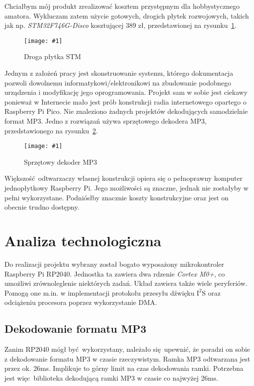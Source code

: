 \documentclass[polish]{aghengthesis}
\newcommand{\imgint}[4]{
	\begin{figure}[{#4}]
		\centering
		\texttt{[image: \#1]}
		\caption{#2}
		\label{#1}
	\end{figure}
}
\newcommand{\imgh}[3]{\imgint{#1}{#2}{#3}{H}}
\newcommand{\isqs}{$\text{I}^{2}\text{S}$}
\begin{document}
		Chciałbym mój produkt zrealizować kosztem przystępnym dla hobbystycznego amatora. Wykluczam zatem użycie gotowych, drogich płytek rozwojowych, takich jak np. \textit{STM32F746G-Disco} kosztującej 389 zł, przedstawionej na rysunku~\ref{1/botland_stm}.
		
		\imgh{1/botland_stm}{Droga płytka STM\textsuperscript{\cite{botland_stm}}}{0.6}
		
		Jednym z założeń pracy jest skonstruowanie systemu, którego dokumentacja pozwoli dowolnemu informatykowi/elektronikowi na zbudowanie podobnego urządzenia i modyfikację jego oprogramowania. Projekt sam w sobie jest ciekawy ponieważ w Internecie mało jest prób konstrukcji radia internetowego opartego o Raspberry Pi Pico. Nie znaleziono żadnych projektów dekodujących samodzielnie format MP3.  Jedno z rozwiązań\textsuperscript{\cite{radio_pico1}} używa sprzętowego dekodera MP3, przedstawionego na rysunku~\ref{1/radio_mp3}.
		
		\imgh{1/radio_mp3}{Sprzętowy dekoder MP3 \textsuperscript{\cite{radio_vs1003}}}{0.6}
		
		 Większość odtwarzaczy własnej konstrukcji opiera się o pełnoprawny komputer jednopłytkowy Raspberry Pi. Jego możliwości są znaczne, jednak nie zostałyby w pełni wykorzystane. Podniósłby znacznie koszty konstrukcyjne oraz jest on obecnie trudno dostępny.
	
	\section{Analiza technologiczna}
		Do realizacji projektu wybrany został bogato wyposażony mikrokontroler Raspberry Pi RP2040\textsuperscript{\cite{rp2040}}.
		Jednostka ta zawiera dwa rdzenie \textit{Cortex M0+}, co umożliwi zrównoleglenie niektórych zadań.
		Układ zawiera także wiele peryferiów. Pomogą one m.in. w implementacji protokołu przesyłu dźwięku \isqs{} oraz odciążeniu procesora poprzez wykorzystanie DMA.
		
		
		\subsection{Dekodowanie formatu MP3}
			Zanim RP2040 mógł być wykorzystany, należało się upewnić, że poradzi on sobie z dekodowanie formatu MP3 w czasie rzeczywistym. Ramka MP3 odtwarzana jest przez ok. 26ms. Implikuje to górny limit na czas dekodowania ramki. Potrzebna jest więc biblioteka dekodującą ramki MP3 w czasie co najwyżej 26ms.
			$ $\\
			
\end{document}
